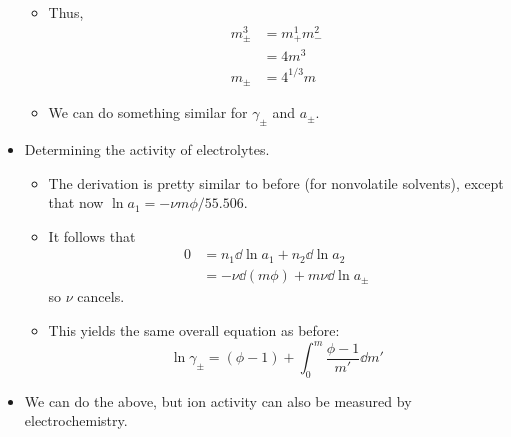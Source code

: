 \documentclass[../notes.tex]{subfiles}
\begin{document}
\begin{itemize}
\begin{itemize}
        \item Thus,
        \begin{align*}
            m_\pm^3 &= m_+^1m_-^2\\
            &= 4m^3\\
            m_\pm &= 4^{1/3}m
        \end{align*}
        \item We can do something similar for $\gamma_\pm$ and $a_\pm$.
    \end{itemize}
    \item Determining the activity of electrolytes.
    \begin{itemize}
        \item The derivation is pretty similar to before (for nonvolatile solvents), except that now $\ln a_1=-\nu m\phi/55.506$.
        \item It follows that
        \begin{align*}
            0 &= n_1\dd{\ln a_1}+n_2\dd{\ln a_2}\\
            &= -\nu\dd{(m\phi)}+m\nu\dd{\ln a_\pm}
        \end{align*}
        so $\nu$ cancels.
        \item This yields the same overall equation as before:
        \begin{equation*}
            \ln\gamma_\pm = (\phi-1)+\int_0^m\frac{\phi-1}{m'}\dd{m'}
        \end{equation*}
    \end{itemize}
    \item We can do the above, but ion activity can also be measured by electrochemistry.
\end{itemize}
\end{document}
